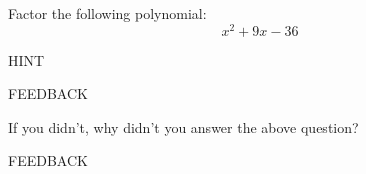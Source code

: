 \documentclass{ximera}
\begin{document}
\begin{problem}
\begin{problem} 
    Factor the following polynomial:
    $$x^2 + 9x -36$$
    
    \begin{hint}
    HINT
    \end{hint}
    
  \begin{multipleChoice}
      
      \begin{feedback}[attempt]
      FEEDBACK
      \end{feedback}
      
  \end{multipleChoice}
  
\end{problem}
\begin{question}

    If you didn't, why didn't you answer the above question?
    
    \begin{multipleChoice}
      
      \begin{feedback}[attempt]
      FEEDBACK
      \end{feedback}
      
  \end{multipleChoice}
\end{question}
\end{problem}
\end{document}
